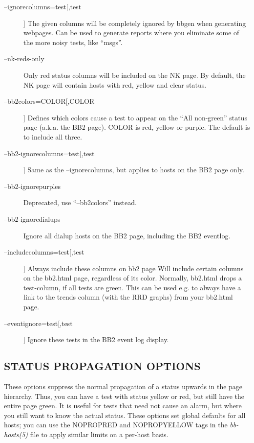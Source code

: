  \begin{description}
\item[--ignorecolumns=test[,test]] The given columns will be
  completely ignored by bbgen when generating webpages. Can be used to
  generate reports where you eliminate some of the more noisy tests,
  like ``msgs''. 


 

\item[--nk-reds-only] Only red status columns will be included on the
  NK page. By default, the NK page will contain hosts with red, yellow
  and clear status. 


 

\item[--bb2colors=COLOR[,COLOR]] Defines which colors cause a test to
  appear on the ``All non-green'' status page (a.k.a. the BB2
  page). COLOR is red, yellow or purple. The default is to include all
  three. 


 

\item[--bb2-ignorecolumns=test[,test]] Same as the --ignorecolumns, but applies to hosts on the BB2 page only. 

 

\item[--bb2-ignorepurples] Deprecated, use ``--bb2colors'' instead. 

 

\item[--bb2-ignoredialups] Ignore all dialup hosts on the BB2 page, including the BB2 eventlog. 

 

\item[--includecolumns=test[,test]] Always include these columns on
  bb2 page Will include certain columns on the bb2.html page,
  regardless of its color. Normally, bb2.html drops a test-column, if
  all tests are green. This can be used e.g. to always have a link to
  the trends column (with the RRD graphs) from your bb2.html page. 


 

\item[--eventignore=test[,test]] Ignore these tests in the BB2 event log display. 

 


\end{description}

\subsection{STATUS PROPAGATION OPTIONS}
 These options suppress the normal propagation of a status upwards in
 the page hierarchy. Thus, you can have a test with status yellow or
 red, but still have the entire page green. It is useful for tests
 that need not cause an alarm, but where you still want to know the
 actual status. These options set global defaults for all hosts; you
 can use the NOPROPRED and NOPROPYELLOW tags in the \emph{bb-hosts(5)}
 file to apply similar limits on a per-host basis. 



